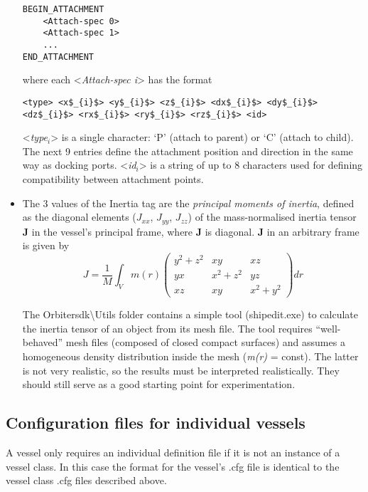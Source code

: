 \documentclass[Orbiter Developer Manual.tex]{subfiles}
\begin{document}
\begin{itemize}
\begin{lstlisting}[language=OSFS]
BEGIN_ATTACHMENT
	<Attach-spec 0>
	<Attach-spec 1>
	...
END_ATTACHMENT
\end{lstlisting}

\noindent
where each <\textit{Attach-spec i}> has the format

\begin{lstlisting}[language=OSFS,mathescape=true]
<type> <x$_{i}$> <y$_{i}$> <z$_{i}$> <dx$_{i}$> <dy$_{i}$> <dz$_{i}$> <rx$_{i}$> <ry$_{i}$> <rz$_{i}$> <id>
\end{lstlisting}

\noindent
<\textit{type}$_{i}$> is a single character: ‘P’ (attach to parent) or ‘C’ (attach to child). The next 9 entries define the attachment position and direction in the same way as docking ports. <\textit{id}$_{i}$> is a string of up to 8 characters used for defining compatibility between attachment points.

\item The 3 values of the Inertia tag are the \textit{principal moments of inertia}, defined as the diagonal elements ($J_{xx}$, $J_{yy}$, $J_{zz}$) of the mass-normalised inertia tensor \textbf{J} in the vessel’s principal frame, where \textbf{J} is diagonal. \textbf{J} in an arbitrary frame is given by
\[ J = \frac{1}{M} \int_{V} m(r)  
\begin{pmatrix}
y^{2} + z^{2} & xy & xz\\
yx & x^{2} + z^{2} & yz\\
xz & xy & x^{2} + y^{2}
\end{pmatrix}
dr
\]

\noindent
The Orbitersdk\textbackslash Utils folder contains a simple tool (shipedit.exe) to calculate the inertia tensor of an object from its mesh file. The tool requires “well-behaved” mesh files (composed of closed compact surfaces) and assumes a homogeneous density distribution inside the mesh (\textit{m(r)} = const). The latter is not very realistic, so the results must be interpreted realistically. They should still serve as a good starting point for experimentation.

\end{itemize}


\subsection{Configuration files for individual vessels}
A vessel only requires an individual definition file if it is not an instance of a vessel class. In this case the format for the vessel’s .cfg file is identical to the vessel class .cfg files described above.
\end{document}
